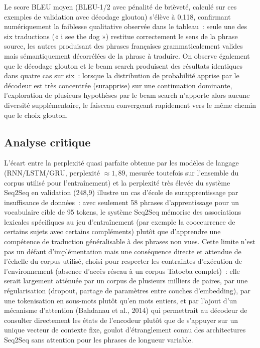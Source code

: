 \documentclass[11pt,a4paper]{article}
\begin{document}
Le score BLEU moyen (BLEU-1/2 avec pénalité de brièveté, calculé sur ces exemples de validation avec décodage glouton) s'élève à 0,118, confirmant numériquement la faiblesse qualitative observée dans le tableau~: seule une des six traductions (« i see the dog ») restitue correctement le sens de la phrase source, les autres produisant des phrases françaises grammaticalement valides mais sémantiquement décorrélées de la phrase à traduire. On observe également que le décodage glouton et le beam search produisent des résultats identiques dans quatre cas sur six~: lorsque la distribution de probabilité apprise par le décodeur est très concentrée (surapprise) sur une continuation dominante, l'exploration de plusieurs hypothèses par le beam search n'apporte alors aucune diversité supplémentaire, le faisceau convergeant rapidement vers le même chemin que le choix glouton.

\subsection{Analyse critique}

L'écart entre la perplexité quasi parfaite obtenue par les modèles de langage (RNN/LSTM/GRU, perplexité $\approx 1,89$, mesurée toutefois sur l'ensemble du corpus utilisé pour l'entraînement) et la perplexité très élevée du système Seq2Seq en validation (248,9) illustre un cas d'école de surapprentissage par insuffisance de données~: avec seulement 58 phrases d'apprentissage pour un vocabulaire cible de 95 tokens, le système Seq2Seq mémorise des associations lexicales spécifiques au jeu d'entraînement (par exemple la cooccurrence de certains sujets avec certains compléments) plutôt que d'apprendre une compétence de traduction généralisable à des phrases non vues. Cette limite n'est pas un défaut d'implémentation mais une conséquence directe et attendue de l'échelle du corpus utilisé, choisi pour respecter les contraintes d'exécution de l'environnement (absence d'accès réseau à un corpus Tatoeba complet)~: elle serait largement atténuée par un corpus de plusieurs milliers de paires, par une régularisation (dropout, partage de paramètres entre couches d'embedding), par une tokenisation en sous-mots plutôt qu'en mots entiers, et par l'ajout d'un mécanisme d'attention (Bahdanau et al., 2014) qui permettrait au décodeur de consulter directement les états de l'encodeur plutôt que de s'appuyer sur un unique vecteur de contexte fixe, goulot d'étranglement connu des architectures Seq2Seq sans attention pour les phrases de longueur variable.
\end{document}
